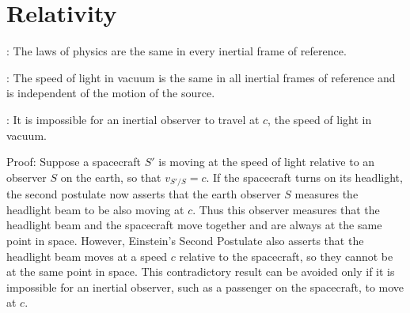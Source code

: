 \chapter{Relativity}

    \par {}: The laws of physics are the same
      in every inertial frame of reference.
    \par {}: The speed of light in vacuum is
      the same in all inertial frames of reference and is independent of the
      motion of the source.
    \par {}: It is impossible for an
      inertial observer to travel at $c$, the speed of light in vacuum.
    \begin{smfont}
      \par Proof: Suppose a spacecraft $S'$ is moving at the speed of light
        relative to an observer $S$ on the earth, so that $v_{S'/S} = c$.
        If the spacecraft turns on its headlight, the second postulate now
        asserts that the earth observer $S$ measures the headlight beam
        to be also moving at $c$. Thus this observer measures that the
        headlight beam and the spacecraft move together and are always at
        the same point in space. However, Einstein's Second Postulate also
        asserts that the headlight beam moves at a speed $c$ relative to
        the spacecraft, so they cannot be at the same point in space. This
        contradictory result can be avoided only if it is impossible for
        an inertial observer, such as a passenger on the spacecraft, to
        move at $c$.
    \end{smfont}